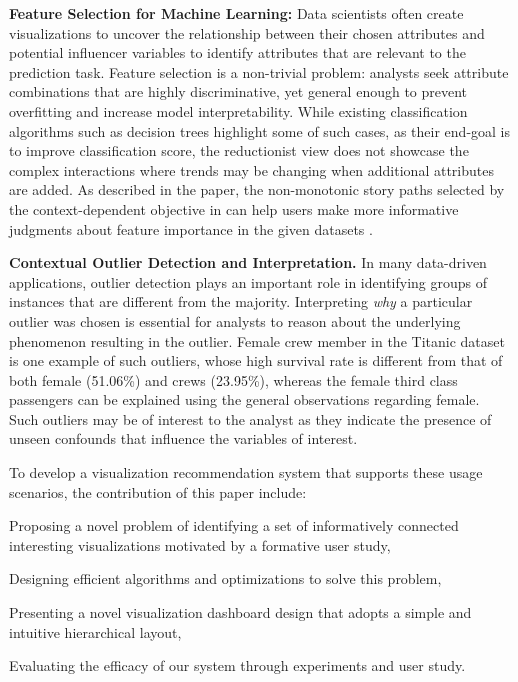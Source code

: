 \npar \textbf{Feature Selection for Machine Learning:} Data scientists often create visualizations to uncover the relationship between their chosen attributes and potential influencer variables to identify attributes that are relevant to the prediction task. Feature selection is a non-trivial problem: analysts seek attribute combinations that are highly discriminative, yet general enough to prevent overfitting and increase model interpretability. While existing classification algorithms such as decision trees highlight some of such cases, as their end-goal is to improve classification score, the reductionist view does not showcase the complex interactions where trends may be changing when additional attributes are added. As described in the paper, the non-monotonic story paths selected by the context-dependent objective in \system can help users make more informative judgments about feature importance in the given datasets . 

\npar \textbf{Contextual Outlier Detection and Interpretation.} In many data-driven applications, outlier detection plays an important role in identifying groups of instances that are different from the majority. Interpreting \textit{why} a particular outlier was chosen is essential for analysts to reason about the underlying phenomenon resulting in the outlier. Female crew member in the Titanic dataset is one example of such outliers, whose high survival rate is different from that of both female (51.06\%) and crews (23.95\%), whereas the female third class passengers can be explained using the general observations regarding female. Such outliers may be of interest to the analyst as they indicate the presence of unseen confounds that influence the variables of interest.

\par To develop a visualization recommendation system that supports these usage scenarios, the contribution of this paper include: 
\begin{denselist}
\item {}
\item Proposing a novel problem of identifying a set of informatively connected interesting visualizations motivated by a formative user study,
\item Designing efficient algorithms and optimizations to solve this problem,  
\item Presenting a novel visualization dashboard design that adopts a simple and intuitive hierarchical layout,
\item Evaluating the efficacy of our system through experiments and user study.
\end{denselist}